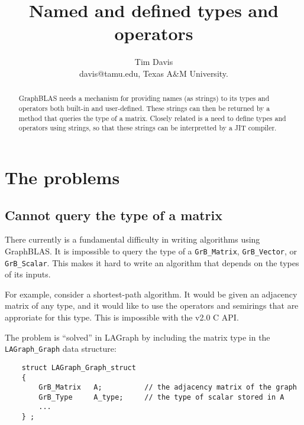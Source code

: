 \documentclass[12pt]{article}
\title{Named and defined types and operators}
\author{Tim Davis \\
\small davis@tamu.edu, Texas A\&M University.}
\begin{document}
\maketitle

\begin{abstract}
GraphBLAS needs a mechanism for providing names (as strings) to its types
and operators both built-in and user-defined.  These strings can then be
returned by a method that queries the type of a matrix. Closely related is a
need to define types and operators using strings, so that these strings can
be interpretted by a JIT compiler.
\end{abstract}

\newpage
\section{The problems}

\subsection{Cannot query the type of a matrix}
\label{matrix_type_query}

There currently is a fundamental difficulty in writing algorithms using
GraphBLAS.  It is impossible to query the type of a \verb'GrB_Matrix',
\verb'GrB_Vector', or \verb'GrB_Scalar'.  This makes it hard to write an
algorithm that depends on the types of its inputs.

For example, consider a shortest-path algorithm.  It would be given an
adjacency matrix of any type, and it would like to use the operators and
semirings that are approriate for this type.
This is impossible with the v2.0 C API.

The problem is ``solved'' in LAGraph by including the matrix type in
the \verb'LAGraph_Graph' data structure:

{\footnotesize
\begin{verbatim}
    struct LAGraph_Graph_struct
    {
        GrB_Matrix   A;          // the adjacency matrix of the graph
        GrB_Type     A_type;     // the type of scalar stored in A
        ...
    } ;
\end{verbatim}}
\end{document}
